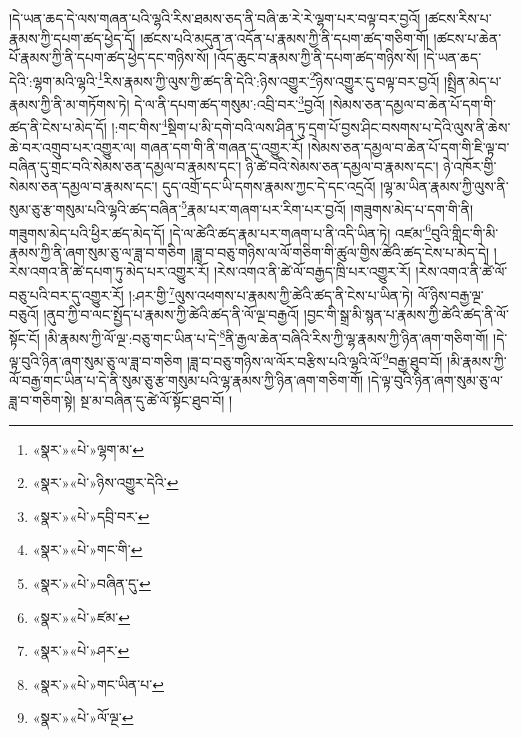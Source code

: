 །དེ་ཡན་ཆད་དེ་ལས་གཞན་པའི་ལྷའི་རིས་ཐམས་ཅད་ནི་བཞི་ཆ་རེ་རེ་ལྷག་པར་བལྟ་བར་བྱའོ། །ཚངས་རིས་པ་རྣམས་ཀྱི་དཔག་ཚད་ཕྱེད་དོ། །ཚངས་པའི་མདུན་ན་འདོན་པ་རྣམས་ཀྱི་ནི་དཔག་ཚད་གཅིག་གོ། །ཚངས་པ་ཆེན་པོ་རྣམས་ཀྱི་ནི་དཔག་ཚད་ཕྱེད་དང་གཉིས་སོ། །འོད་ཆུང་བ་རྣམས་ཀྱི་ནི་དཔག་ཚད་གཉིས་སོ། །དེ་ཡན་ཆད་དེའི་:ལྷག་མའི་ལྷའི་\footnote{«སྣར་»«པེ་»ལྷག་མ་}རིས་རྣམས་ཀྱི་ལུས་ཀྱི་ཚད་ནི་དེའི་:ཉིས་འགྱུར་\footnote{«སྣར་»«པེ་»ཉིས་འགྱུར་དེའི་}ཉིས་འགྱུར་དུ་བལྟ་བར་བྱའོ། །སྤྲིན་མེད་པ་རྣམས་ཀྱི་ནི་མ་གཏོགས་ཏེ། དེ་ལ་ནི་དཔག་ཚད་གསུམ་:འབྲི་བར་\footnote{«སྣར་»«པེ་»དབྲི་བར་}བྱའོ། །སེམས་ཅན་དམྱལ་བ་ཆེན་པོ་དག་གི་ཚད་ནི་ངེས་པ་མེད་དོ། །:གང་གིས་\footnote{«སྣར་»«པེ་»གང་གི་}སྡིག་པ་མི་དགེ་བའི་ལས་ཤིན་ཏུ་དྲག་པོ་བྱས་ཤིང་བསགས་པ་དེའི་ལུས་ནི་ཆེས་ཆེ་བར་འགྲུབ་པར་འགྱུར་ལ། གཞན་དག་གི་ནི་གཞན་དུ་འགྱུར་རོ། །སེམས་ཅན་དམྱལ་བ་ཆེན་པོ་དག་གི་ཇི་ལྟ་བ་བཞིན་དུ་གྲང་བའི་སེམས་ཅན་དམྱལ་བ་རྣམས་དང་། ཉི་ཚེ་བའི་སེམས་ཅན་དམྱལ་བ་རྣམས་དང་། ཉེ་འཁོར་གྱི་སེམས་ཅན་དམྱལ་བ་རྣམས་དང་། དུད་འགྲོ་དང་ཡི་དགས་རྣམས་ཀྱང་དེ་དང་འདྲའོ། །ལྷ་མ་ཡིན་རྣམས་ཀྱི་ལུས་ནི་སུམ་ཅུ་རྩ་གསུམ་པའི་ལྷའི་ཚད་བཞིན་\footnote{«སྣར་»«པེ་»བཞིན་དུ་}རྣམ་པར་གཞག་པར་རིག་པར་བྱའོ། །གཟུགས་མེད་པ་དག་གི་ནི། གཟུགས་མེད་པའི་ཕྱིར་ཚད་མེད་དོ། །དེ་ལ་ཚེའི་ཚད་རྣམ་པར་གཞག་པ་ནི་འདི་ཡིན་ཏེ། འཛམ་\footnote{«སྣར་»«པེ་»ཛམ་}བུའི་གླིང་གི་མི་རྣམས་ཀྱི་ནི་ཞག་སུམ་ཅུ་ལ་ཟླ་བ་གཅིག །ཟླ་བ་བཅུ་གཉིས་ལ་ལོ་གཅིག་གི་ཚུལ་གྱིས་ཚེའི་ཚད་ངེས་པ་མེད་དེ། །རེས་འགའ་ནི་ཚེ་དཔག་ཏུ་མེད་པར་འགྱུར་རོ། །རེས་འགའ་ནི་ཚེ་ལོ་བརྒྱད་ཁྲི་པར་འགྱུར་རོ། །རེས་འགའ་ནི་ཚེ་ལོ་བཅུ་པའི་བར་དུ་འགྱུར་རོ། །:ཤར་གྱི་\footnote{«སྣར་»«པེ་»ཤར་}ལུས་འཕགས་པ་རྣམས་ཀྱི་ཚེའི་ཚད་ནི་ངེས་པ་ཡིན་ཏེ། ལོ་ཉིས་བརྒྱ་ལྔ་བཅུའོ། །ནུབ་ཀྱི་བ་ལང་སྤྱོད་པ་རྣམས་ཀྱི་ཚེའི་ཚད་ནི་ལོ་ལྔ་བརྒྱའོ། །བྱང་གི་སྒྲ་མི་སྙན་པ་རྣམས་ཀྱི་ཚེའི་ཚད་ནི་ལོ་སྟོང་ངོ། །མི་རྣམས་ཀྱི་ལོ་ལྔ་:བཅུ་གང་ཡིན་པ་དེ་\footnote{«སྣར་»«པེ་»གང་ཡིན་པ་}ནི་རྒྱལ་ཆེན་བཞིའི་རིས་ཀྱི་ལྷ་རྣམས་ཀྱི་ཉིན་ཞག་གཅིག་གོ། །དེ་ལྟ་བུའི་ཉིན་ཞག་སུམ་ཅུ་ལ་ཟླ་བ་གཅིག །ཟླ་བ་བཅུ་གཉིས་ལ་ལོར་བརྩིས་པའི་ལྷའི་ལོ་\footnote{«སྣར་»«པེ་»ལོ་ལྔ་}བརྒྱ་ཐུབ་བོ། །མི་རྣམས་ཀྱི་ལོ་བརྒྱ་གང་ཡིན་པ་དེ་ནི་སུམ་ཅུ་རྩ་གསུམ་པའི་ལྷ་རྣམས་ཀྱི་ཉིན་ཞག་གཅིག་གོ། །དེ་ལྟ་བུའི་ཉིན་ཞག་སུམ་ཅུ་ལ་ཟླ་བ་གཅིག་སྟེ། སྔ་མ་བཞིན་དུ་ཚེ་ལོ་སྟོང་ཐུབ་བོ། །
